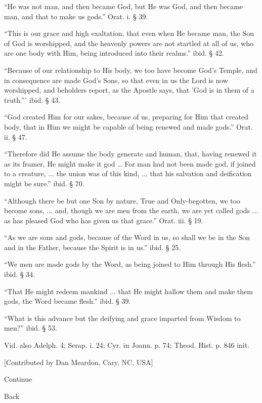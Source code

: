 ``He was not man, and then became God, but He was
God, and then became man, and that to make us gods.'' Orat. i. § 39.

``This is our grace and high exaltation, that even
when He became man, the Son of God is worshipped, and the
heavenly powers are not startled at all of us, who are one body with
Him, being introduced into their realms.'' ibid. § 42.

``Because of our relationship to His body, we too
have become God's Temple, and in consequence are made God's Sons, so
that even in us the Lord is now worshipped, and beholders report, as
the Apostle says, that 'God is in them of a truth.''' ibid. § 43.

``God created Him for our sakes, because of us,
preparing for Him that created body, that in Him we might be capable
of being renewed and made gods.'' Orat. ii. § 47.

``Therefore did He assume the body generate and
human, that, having renewed it as its framer, He might make it god …
For man had not been made god, if joined to a creature, ... the union
was of this kind, ... that his salvation and deification might be
sure.'' ibid. § 70.

``Although there be but one Son by nature, True
and Only-begotten, we too become sons, ... and, though we are men from
the earth, we are yet called gods ... as has pleased God who has given
us that grace.'' Orat. iii. § 19.

``As we are sons and gods, because of the Word in
us, so shall we be in the Son and in the Father, because the Spirit is
in us.'' ibid. § 25.

``We men are made gods by the Word, as being
joined to Him through His flesh.'' ibid. § 34.

``That He might redeem mankind ... that He might hallow them and make them gods, the Word became flesh.'' ibid. §
39.

``What is this advance but the deifying and grace
imparted from Wisdom to men?'' ibid. § 53.

Vid. also Adelph. 4; Serap. i. 24; Cyr. in Joann.
p. 74; Theod. Hist. p. 846 init.

[Contributed by Dan Meardon, Cary, NC, USA]

Continue

Back


